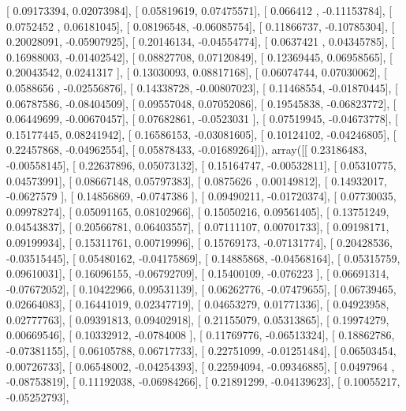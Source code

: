 \documentclass{article}
\begin{document}
       [ 0.09173394,  0.02073984],
       [ 0.05819619,  0.07475571],
       [ 0.066412  , -0.11153784],
       [ 0.0752452 ,  0.06181045],
       [ 0.08196548, -0.06085754],
       [ 0.11866737, -0.10785304],
       [ 0.20028091, -0.05907925],
       [ 0.20146134, -0.04554774],
       [ 0.0637421 ,  0.04345785],
       [ 0.16988003, -0.01402542],
       [ 0.08827708,  0.07120849],
       [ 0.12369445,  0.06958565],
       [ 0.20043542,  0.0241317 ],
       [ 0.13030093,  0.08817168],
       [ 0.06074744,  0.07030062],
       [ 0.0588656 , -0.02556876],
       [ 0.14338728, -0.00807023],
       [ 0.11468554, -0.01870445],
       [ 0.06787586, -0.08404509],
       [ 0.09557048,  0.07052086],
       [ 0.19545838, -0.06823772],
       [ 0.06449699, -0.00670457],
       [ 0.07682861, -0.0523031 ],
       [ 0.07519945, -0.04673778],
       [ 0.15177445,  0.08241942],
       [ 0.16586153, -0.03081605],
       [ 0.10124102, -0.04246805],
       [ 0.22457868, -0.04962554],
       [ 0.05878433, -0.01689264]]), array([[ 0.23186483, -0.00558145],
       [ 0.22637896,  0.05073132],
       [ 0.15164747, -0.00532811],
       [ 0.05310775,  0.04573991],
       [ 0.08667148,  0.05797383],
       [ 0.0875626 ,  0.00149812],
       [ 0.14932017, -0.0627579 ],
       [ 0.14856869, -0.0747386 ],
       [ 0.09490211, -0.01720374],
       [ 0.07730035,  0.09978274],
       [ 0.05091165,  0.08102966],
       [ 0.15050216,  0.09561405],
       [ 0.13751249,  0.04543837],
       [ 0.20566781,  0.06403557],
       [ 0.07111107,  0.00701733],
       [ 0.09198171,  0.09199934],
       [ 0.15311761,  0.00719996],
       [ 0.15769173, -0.07131774],
       [ 0.20428536, -0.03515445],
       [ 0.05480162, -0.04175869],
       [ 0.14885868, -0.04568164],
       [ 0.05315759,  0.09610031],
       [ 0.16096155, -0.06792709],
       [ 0.15400109, -0.076223  ],
       [ 0.06691314, -0.07672052],
       [ 0.10422966,  0.09531139],
       [ 0.06262776, -0.07479655],
       [ 0.06739465,  0.02664083],
       [ 0.16441019,  0.02347719],
       [ 0.04653279,  0.01771336],
       [ 0.04923958,  0.02777763],
       [ 0.09391813,  0.09402918],
       [ 0.21155079,  0.05313865],
       [ 0.19974279,  0.00669546],
       [ 0.10332912, -0.0784008 ],
       [ 0.11769776, -0.06513324],
       [ 0.18862786, -0.07381155],
       [ 0.06105788,  0.06717733],
       [ 0.22751099, -0.01251484],
       [ 0.06503454,  0.00726733],
       [ 0.06548002, -0.04254393],
       [ 0.22594094, -0.09346885],
       [ 0.0497964 , -0.08753819],
       [ 0.11192038, -0.06984266],
       [ 0.21891299, -0.04139623],
       [ 0.10055217, -0.05252793],
\end{document}
